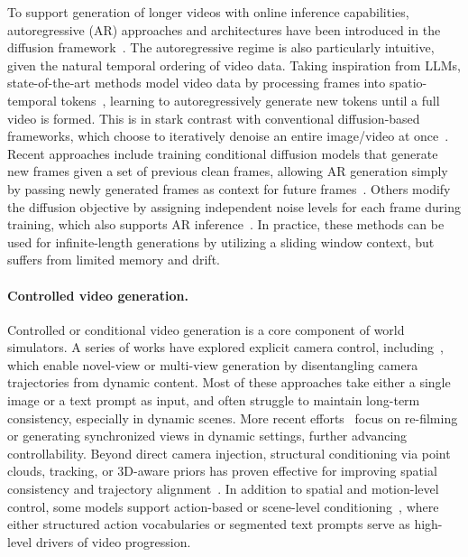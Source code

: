 To support generation of longer videos with online inference capabilities, autoregressive (AR) approaches and architectures have been introduced in the diffusion framework~\cite{sun2024autoregressive,kondratyuk2024videopoet,yan2021videogpt,wang2024loong}. The autoregressive regime is also particularly intuitive, given the natural temporal ordering of video data. Taking inspiration from LLMs, state-of-the-art methods model video data by processing frames into spatio-temporal tokens~\cite{Lin2024OpenSoraPO,Zheng2024OpenSoraDE,Yang2024CogVideoXTD,Tang2024VidTokAV,Fei2025SkyReelsA2CA,Qiu2025SkyReelsA1EP,Chen2025SkyReelsV2IF}, learning to autoregressively generate new tokens until a full video is formed. This is in stark contrast with conventional diffusion-based frameworks, which choose to iteratively denoise an entire image/video at once~\cite{blattmann2023stable,li2022efficient,ho2022video,singer2022make,yang2024cogvideox,kong2024hunyuanvideo,hacohen2024ltx, oshima2024ssm}. Recent approaches include training conditional diffusion models that generate new frames given a set of previous clean frames, allowing AR generation simply by passing newly generated frames as context for future frames~\cite{ho2022video,he2022latent,chen2023seine,jin2024pyramidal,zhang2024extdm,gao2024ca2,gao2024vid}. Others modify the diffusion objective by assigning independent noise levels for each frame during training, which also supports AR inference~\cite{chen2024diffusion,yin2024causvid,song2025history}. In practice, these methods can be used for infinite-length generations by utilizing a sliding window context, but suffers from limited memory and drift.


\paragraph{Controlled video generation.} 
Controlled or conditional video generation is a core component of world simulators. 
A series of works have explored explicit camera control, including~\cite{wang2024motionctrl,he2025cameractrl,he2025cameractrl2,he2025cameractrl2,bahmani2025vd3d,bahmani2025ac3d}, which enable novel-view or multi-view generation by disentangling camera trajectories from dynamic content. Most of these approaches take either a single image or a text prompt as input, and often struggle to maintain long-term consistency, especially in dynamic scenes. 
More recent efforts~\cite{zhang2024recapture,bai2025syncammaster,bai2025recammaster} focus on re-filming or generating synchronized views in dynamic settings, further advancing controllability. 
Beyond direct camera injection, structural conditioning via point clouds, tracking, or 3D-aware priors has proven effective for improving spatial consistency and trajectory alignment~\cite{yu2024viewcrafter,ren2025gen3c,gu2025das,yu2025trajectorycrafter, chen2025flexworld}.
In addition to spatial and motion-level control, some models support action-based or scene-level conditioning~\cite{parkerholder2024genie2,oasis2024}, where either structured action vocabularies or segmented text prompts serve as high-level drivers of video progression.

